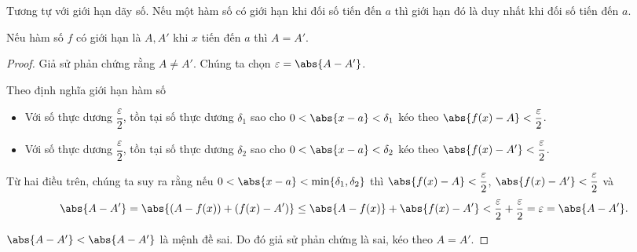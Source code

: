Tương tự với giới hạn dãy số. Nếu một hàm số có giới hạn khi đối số tiến đến $a$ thì giới hạn đó là duy nhất khi đối số tiến đến $a$.
\begin{theorem}\label{theorem:uniqueness-of-function-limit-part-1}
    Nếu hàm số $f$ có giới hạn là $A, A'$ khi $x$ tiến đến $a$ thì $A = A'$.
\end{theorem}

\begin{proof}
    Giả sử phản chứng rằng $A\ne A'$. Chúng ta chọn $\varepsilon = \abs{A - A'}$.

    Theo định nghĩa giới hạn hàm số
    \begin{itemize}
        \item Với số thực dương $\dfrac{\varepsilon}{2}$, tồn tại số thực dương $\delta_{1}$ sao cho $0 < \abs{x - a} < \delta_{1}$ kéo theo $\abs{f(x) - A} < \dfrac{\varepsilon}{2}$.
        \item Với số thực dương $\dfrac{\varepsilon}{2}$, tồn tại số thực dương $\delta_{2}$ sao cho $0 < \abs{x - a} < \delta_{2}$ kéo theo $\abs{f(x) - A'} < \dfrac{\varepsilon}{2}$.
    \end{itemize}

    Từ hai điều trên, chúng ta suy ra rằng nếu $0 < \abs{x - a} < \min\{ \delta_{1}, \delta_{2} \}$ thì $\abs{f(x) - A} < \dfrac{\varepsilon}{2}$, $\abs{f(x) - A'} < \dfrac{\varepsilon}{2}$ và
    \[
        \abs{A - A'} = \abs{(A - f(x)) + (f(x) - A')}\leq \abs{A - f(x)} + \abs{f(x) - A'} < \frac{\varepsilon}{2} + \frac{\varepsilon}{2} = \varepsilon = \abs{A - A'}.
    \]

    $\abs{A - A'} < \abs{A - A'}$ là mệnh đề sai. Do đó giả sử phản chứng là sai, kéo theo $A = A'$.
\end{proof}

